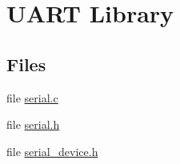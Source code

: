 \hypertarget{group__uart}{}\section{U\+A\+R\+T Library}
\label{group__uart}
\subsection*{Files}
\begin{DoxyCompactItemize}
\item 
file \hyperlink{serial_8c}{serial.\+c}
\item 
file \hyperlink{serial_8h}{serial.\+h}
\item 
file \hyperlink{serial__device_8h}{serial\+\_\+device.\+h}
\end{DoxyCompactItemize}
